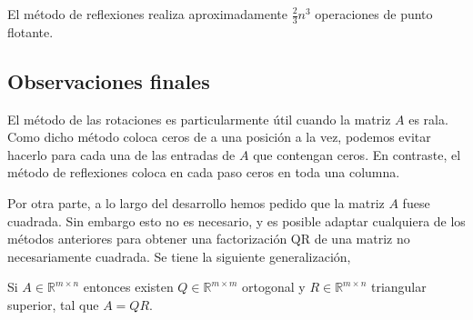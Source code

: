 El método de reflexiones realiza aproximadamente $\frac{2}{3}n^3$ operaciones de punto flotante.

\subsection{Observaciones finales}

El método de las rotaciones es particularmente útil cuando la matriz $A$ es rala. Como dicho método coloca ceros de a una posición a la vez, podemos evitar hacerlo para cada una de las entradas de $A$ que contengan ceros. En contraste, el método de reflexiones coloca en cada paso ceros en toda una columna.

Por otra parte, a lo largo del desarrollo hemos pedido que la matriz $A$ fuese cuadrada. Sin embargo esto no es necesario, y es posible adaptar cualquiera de los métodos anteriores para obtener una factorización QR de una matriz no necesariamente cuadrada. Se tiene la siguiente generalización,

\begin{propo}
Si $A \in \mathbb{R}^{m \times n}$ entonces existen $Q \in \mathbb{R}^{m \times m}$ ortogonal y $R \in \mathbb{R}^{m \times n}$ triangular superior, tal que $A = QR$.
\end{propo}
